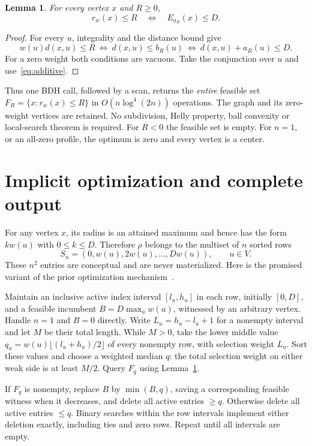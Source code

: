 \documentclass[11pt]{article}
\newtheorem{lemma}[theorem]{Lemma}
\begin{document}
\begin{lemma}\label{lem:threshold}
For every vertex $x$ and $R\geq0$,
\[
 r_w(x)\leq R\quad\Longleftrightarrow\quad E_{a_R}(x)\leq D.
\]
\end{lemma}
\begin{proof}
For every $u$, integrality and the distance bound give
\[
 w(u)d(x,u)\leq R
 \ \Longleftrightarrow\ d(x,u)\leq b_R(u)
 \ \Longleftrightarrow\ d(x,u)+a_R(u)\leq D.
\]
For a zero weight both conditions are vacuous. Take the conjunction
over $u$ and use~\eqref{eq:additive}.
\end{proof}

Thus one BDH call, followed by a scan, returns the \emph{entire} feasible
set $F_R=\{x:r_w(x)\leq R\}$ in $O(n\log^4(2n))$ operations.
The graph and its zero-weight vertices are retained. No subdivision,
Helly property, ball convexity or local-search theorem is required.
For $R<0$ the feasible set is empty. For $n=1$, or an all-zero profile,
the optimum is zero and every vertex is a center.

\section{Implicit optimization and complete output}
For any vertex $x$, its radius is an attained maximum and hence has the
form $k w(u)$ with $0\leq k\leq D$. Therefore $\rho$ belongs to the
multiset of $n$ sorted rows
\[
 S_u=(0,w(u),2w(u),\ldots,Dw(u)),\qquad u\in V.
\]
These $n^2$ entries are conceptual and are never materialized. Here is
the promised variant of the prior optimization mechanism~\cite{D26}.

Maintain an inclusive active index interval $[l_u,h_u]$ in each row,
initially $[0,D]$, and a feasible incumbent $B=D\max_u w(u)$, witnessed
by an arbitrary vertex. Handle $n=1$ and $B=0$ directly. Write
$L_u=h_u-l_u+1$ for a nonempty interval and let $M$ be their total length.
While $M>0$, take the lower middle value
$q_u=w(u)\lfloor(l_u+h_u)/2\rfloor$ of every nonempty row, with
selection weight $L_u$. Sort these values and choose a weighted median
$q$: the total selection weight on either weak side is at least $M/2$.
Query $F_q$ using Lemma~\ref{lem:threshold}.

If $F_q$ is nonempty, replace $B$ by $\min(B,q)$, saving a corresponding
feasible witness when it decreases, and delete all active entries
$\geq q$. Otherwise delete all active entries $\leq q$. Binary searches
within the row intervals implement either deletion exactly, including
ties and zero rows. Repeat until all intervals are empty.
\end{document}
